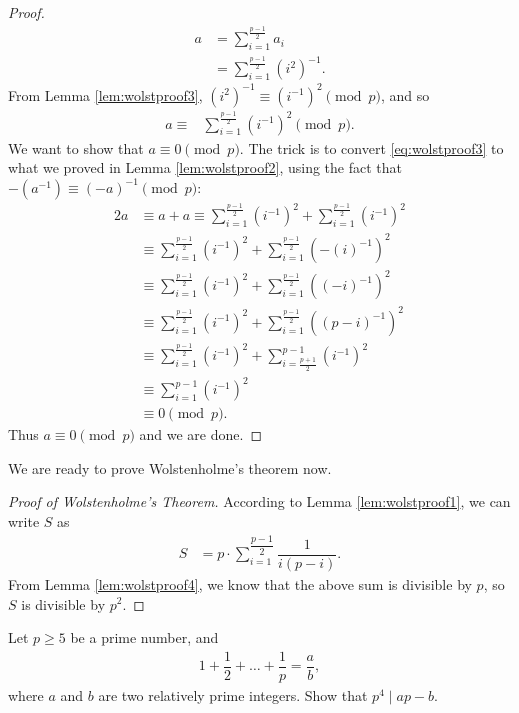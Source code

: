 \documentclass[12pt]{subfile}
\begin{document}
\begin{proof}
				\begin{align*}
					a
						& = \sum_{i=1}^{\frac{p-1}{2}} a_i\\
						& = \sum_{i=1}^{\frac{p-1}{2}} (i^2)^{-1}.
				\end{align*}
			From Lemma \ref{lem:wolstproof3},  $(i^2)^{-1} \equiv (i^{-1})^{2} \pmod p$, and so
				\begin{align}\label{eq:wolstproof3}
					a \equiv
						& \sum_{i=1}^{\frac{p-1}{2}} (i^{-1})^{2} \pmod p.
				\end{align}
			We want to show that $a \equiv 0 \pmod p$. The trick is to convert \eqref{eq:wolstproof3} to what we proved in Lemma \ref{lem:wolstproof2}, using the fact that $-(a^{-1}) \equiv (-a)^{-1} \pmod p$:
				\begin{align*}
					2a
						&\equiv a+a \equiv \sum_{i=1}^{\frac{p-1}{2}} (i^{-1})^{2} + \sum_{i=1}^{\frac{p-1}{2}} (i^{-1})^{2}\\
						& \equiv \sum_{i=1}^{\frac{p-1}{2}} (i^{-1})^{2} + \sum_{i=1}^{\frac{p-1}{2}} (-(i)^{-1})^{2}  \\
						&\equiv \sum_{i=1}^{\frac{p-1}{2}} (i^{-1})^{2} + \sum_{i=1}^{\frac{p-1}{2}} ((-i)^{-1})^{2}\\
						& \equiv \sum_{i=1}^{\frac{p-1}{2}} (i^{-1})^{2} + \sum_{i=1}^{\frac{p-1}{2}} ((p-i)^{-1})^{2}\\
						& \equiv \sum_{i=1}^{\frac{p-1}{2}} (i^{-1})^{2} + \sum_{i=\frac{p+1}{2}}^{p-1} (i^{-1})^{2}\\
						& \equiv \sum_{i=1}^{p-1} (i^{-1})^{2}\\
						& \equiv 0 \pmod p.
				\end{align*}
			Thus $a \equiv 0 \pmod p$ and we are done.
		\end{proof}
	We are ready to prove Wolstenholme's theorem now.
		\begin{proof}[Proof of Wolstenholme's Theorem]
			According to Lemma \ref{lem:wolstproof1}, we can write $S$ as
			\begin{align*}
				S
					& = p \cdot \sum_{i=1}^{\dfrac{p-1}{2}} \dfrac{1}{i(p-i)}.
			\end{align*}
			From Lemma \ref{lem:wolstproof4}, we know that the above sum is divisible by $p$, so $S$ is divisible by $p^2$.
		\end{proof}

		\begin{problem}
			Let $p \geq 5$ be a prime number, and
				\begin{align*}
					1 + \dfrac{1}{2} + \ldots + \dfrac{1}{p}=\dfrac{a}{b},
				\end{align*}
			where $a$ and $b$ are two relatively prime integers. Show that $p^4\mid ap-b$.
		\end{problem}
\end{document}
